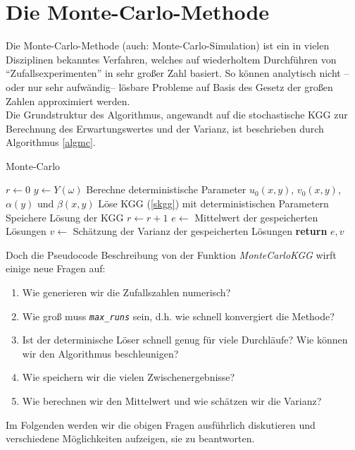\section{Die Monte-Carlo-Methode} %
Die Monte-Carlo-Methode (auch: Monte-Carlo-Simulation) ist ein in vielen Disziplinen bekanntes Verfahren, welches auf wiederholtem Durchführen von "`Zufallsexperimenten"' in sehr großer Zahl basiert. So können analytisch nicht --oder nur sehr aufwändig-- lösbare Probleme auf Basis des Gesetz der großen Zahlen approximiert werden.\\
Die Grundstruktur des Algorithmus, angewandt auf die stochastische KGG zur Berechnung des Erwartungswertes und der Varianz, ist beschrieben durch Algorithmus \ref{algmc}.
\begin{algorithm}[ht]
    \caption{Monte-Carlo}
    \label{algmc}
    \begin{algorithmic}[1] %
            \State $r\gets 0$
             
                \State $y \gets Y(\omega)$ 
                \State Berechne deterministische Parameter $u_0(x,y)$, $v_0(x,y)$, $\alpha(y)$ und $\beta(x,y)$
                \State Löse KGG (\ref{skgg}) mit deterministischen Parametern
                \State Speichere Lösung der KGG
                \State $r\gets r+1$
            \EndWhile
            \State $e\gets$ Mittelwert der gespeicherten Lösungen
            \State $v\gets$ Schätzung der Varianz der gespeicherten Lösungen
            \State \textbf{return} $e, v$
        \EndFunction
    \end{algorithmic}
\end{algorithm}
Doch die Pseudocode Beschreibung von der Funktion \emph{MonteCarloKGG} wirft einige neue Fragen auf:
\begin{enumerate}
\item Wie generieren wir die Zufallszahlen numerisch? \label{mcgeneraterandom}
\item Wie groß muss \emph{\texttt{max\_runs}} sein, d.h. wie schnell konvergiert die Methode?
\item Ist der determinische Löser schnell genug für viele Durchläufe? Wie können wir den Algorithmus beschleunigen?
\item Wie speichern wir die vielen Zwischenergebnisse? \label{mcsaveresults}
\item Wie berechnen wir den Mittelwert und wie schätzen wir die Varianz? \label{mcestimations}
\end{enumerate}
Im Folgenden werden wir die obigen Fragen ausführlich diskutieren und verschiedene Möglichkeiten aufzeigen, sie zu beantworten.
